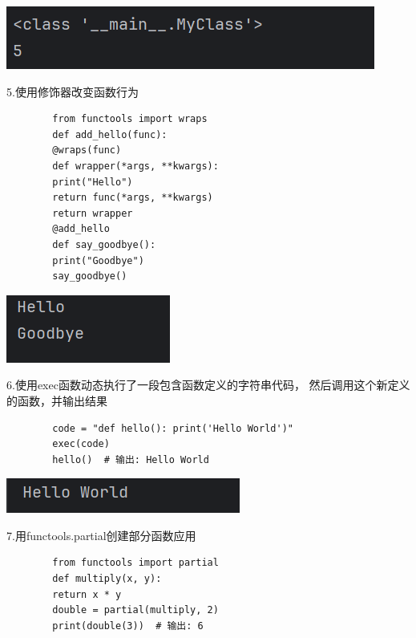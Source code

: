 \documentclass{article}
\begin{document}
	\noindent
	\begin{minipage}{\linewidth}
		\centering
		\includegraphics[width=0.5\linewidth]{example7.png}
		\label{fig:example}
	\end{minipage}
	
	5.使用修饰器改变函数行为
	\begin{verbatim}
		from functools import wraps
		def add_hello(func):
		@wraps(func)
		def wrapper(*args, **kwargs):
		print("Hello")
		return func(*args, **kwargs)
		return wrapper
		@add_hello
		def say_goodbye():
		print("Goodbye")
		say_goodbye()
	\end{verbatim}
	
	\noindent
	\begin{minipage}{\linewidth}
		\centering
		\includegraphics[width=0.5\linewidth]{example8.png}
		\label{fig:example}
	\end{minipage}
	
	6.使用exec函数动态执行了一段包含函数定义的字符串代码，
	然后调用这个新定义的函数，并输出结果
	
	\begin{verbatim}
		code = "def hello(): print('Hello World')"
		exec(code)
		hello()  # 输出: Hello World
	\end{verbatim}
	
	\noindent
	\begin{minipage}{\linewidth}
		\centering
		\includegraphics[width=0.5\linewidth]{example9.png}
		\label{fig:example}
	\end{minipage}
	
	7.用functools.partial创建部分函数应用
	\begin{verbatim}
		from functools import partial
		def multiply(x, y):
		return x * y
		double = partial(multiply, 2)
		print(double(3))  # 输出: 6
	\end{verbatim}
	
\end{document}
